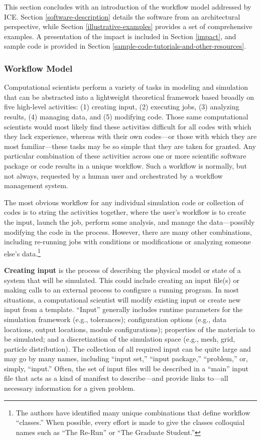 This section concludes with an introduction of the workflow model addressed by
ICE. Section \ref{software-description} details the software
from an architectural perspective, while Section \ref{illustrative-examples}
provides a set of comprehensive examples. A
presentation of the impact is included in Section \ref{impact}, and sample 
code is provided in Section \ref{sample-code-tutorials-and-other-resources}.

\subsubsection{Workflow Model}\label{workflow-model}

Computational scientists perform a variety of tasks in modeling and
simulation that can be abstracted into a lightweight theoretical
framework based broadly on five high-level activities: (1)
creating input, (2) executing jobs, (3) analyzing results, (4) managing
data, and (5) modifying code. Those same computational scientists would
most likely find these activities difficult for all codes with which
they lack experience, whereas with their own codes---or those with which
they are most familiar---these tasks may be so simple that they are
taken for granted. Any particular combination of these activities across
one or more scientific software package or code results in a unique
workflow. Such a workflow is normally, but not always, requested
by a human user and orchestrated by a workflow management system.

The most obvious workflow for any individual simulation code or
collection of codes is to string the activities together, where the user's
workflow is to create the input, launch the job, perform some analysis,
and manage the data---possibly modifying the code in the process. However, 
there are many other combinations, including re-running jobs with
conditions or modifications or analyzing someone else's data.\footnote{The
authors have identified many unique combinations that
define workflow ``classes.'' When possible, every effort is made to give the
classes colloquial names such as ``The Re-Run'' or ``The Graduate Student.''}

\textbf{Creating input} is the process of describing the physical model
or state of a system that will be simulated. This could include creating
an input file(s) or making calls to an external process to configure a
running program. In most situations, a computational scientist will
modify existing input or create new input from a template. ``Input''
generally includes runtime parameters for the simulation framework
(e.g., tolerances); configuration options (e.g., data locations, output
locations, module configurations); properties of the materials to be
simulated; and a discretization of the simulation space (e.g., mesh,
grid, particle distribution). The collection of all required input can
be quite large and may go by many names, including ``input set,''
``input package,'' ``problem,'' or, simply, ``input.'' Often, the set of
input files will be described in a ``main'' input file that acts as a
kind of manifest to describe---and provide links to---all necessary
information for a given problem.

